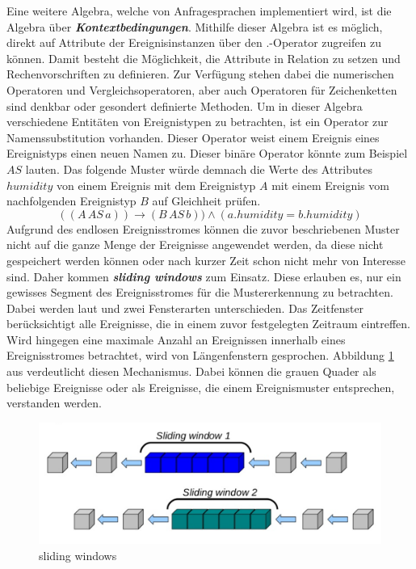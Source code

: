 \documentclass{acm_proc_article-sp}
\begin{document}
Eine weitere Algebra, welche von Anfragesprachen implementiert wird, ist die Algebra über 
\textbf{\textit{Kontextbedingungen}}. Mithilfe dieser Algebra ist es möglich, direkt 
auf Attribute der Ereignisinstanzen über den $.$-Operator zugreifen zu können. Damit 
besteht die Möglichkeit, die Attribute in Relation zu setzen und Rechenvorschriften zu 
definieren. Zur Verfügung stehen dabei die numerischen Operatoren und 
Vergleichsoperatoren, aber auch Operatoren für Zeichenketten sind denkbar oder gesondert 
definierte Methoden. Um in dieser Algebra verschiedene Entitäten von Ereignistypen zu 
betrachten, ist ein Operator zur Namenssubstitution vorhanden. Dieser Operator weist 
einem Ereignis eines Ereignistyps einen neuen Namen zu. Dieser binäre Operator könnte zum 
Beispiel $AS$ lauten. Das folgende Muster würde demnach die Werte des Attributes 
$humidity$ von einem Ereignis mit dem Ereignistyp $A$ mit einem Ereignis vom 
nachfolgenden Ereignistyp $B$ auf Gleichheit prüfen.
$$((A\, AS\, a)) \rightarrow (B\, AS\, b)) \land (a.humidity = b.humidity)$$
Aufgrund des endlosen Ereignisstromes können die zuvor beschriebenen Muster nicht auf 
die ganze Menge der Ereignisse angewendet werden, da diese nicht gespeichert werden 
können oder nach kurzer Zeit schon nicht mehr von Interesse sind. Daher kommen 
\textbf{\textit{sliding windows}} zum Einsatz. Diese erlauben es, nur ein 
gewisses Segment des Ereignisstromes für die Mustererkennung zu betrachten. Dabei werden 
laut \cite{bruns} und \cite{hedtstuck} zwei Fensterarten unterschieden. Das Zeitfenster 
berücksichtigt alle Ereignisse, die in einem zuvor festgelegten Zeitraum eintreffen. 
Wird hingegen eine maximale Anzahl an Ereignissen innerhalb eines 
Ereignisstromes betrachtet, wird von Längenfenstern gesprochen. Abbildung 
\ref{img:sliding-windows} aus \cite{drools-slide} verdeutlicht diesen Mechanismus. Dabei 
können die grauen Quader als beliebige Ereignisse oder als Ereignisse, die einem 
Ereignismuster entsprechen, verstanden werden.

\begin{figure}[H]
    \centering
    \includegraphics[width=\linewidth]{img/sliding-windows.png}
    \caption{sliding windows}
    \label{img:sliding-windows}
\end{figure}
\end{document}
